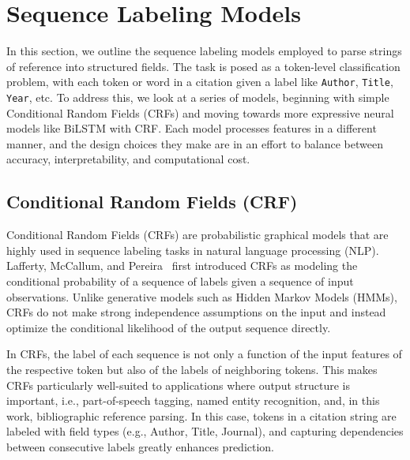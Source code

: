 \section{Sequence Labeling Models}
In this section, we outline the sequence labeling models employed to parse strings of reference into structured fields. The task is posed as a token-level classification problem, with each token or word in a citation given a label like \texttt{Author}, \texttt{Title}, \texttt{Year}, etc. To address this, we look at a series of models, beginning with simple Conditional Random Fields (CRFs) and moving towards more expressive neural models like BiLSTM with CRF. Each model processes features in a different manner, and the design choices they make are in an effort to balance between accuracy, interpretability, and computational cost.
\subsection{Conditional Random Fields (CRF)}
Conditional Random Fields (CRFs) are probabilistic graphical models that are highly used in sequence labeling tasks in natural language processing (NLP). Lafferty, McCallum, and Pereira~\cite{crf2001} first introduced CRFs as modeling the conditional probability of a sequence of labels given a sequence of input observations. Unlike generative models such as Hidden Markov Models (HMMs), CRFs do not make strong independence assumptions on the input and instead optimize the conditional likelihood of the output sequence directly.

In CRFs, the label of each sequence is not only a function of the input features of the respective token but also of the labels of neighboring tokens. This makes CRFs particularly well-suited to applications where output structure is important, i.e., part-of-speech tagging, named entity recognition, and, in this work, bibliographic reference parsing. In this case, tokens in a citation string are labeled with field types (e.g., Author, Title, Journal), and capturing dependencies between consecutive labels greatly enhances prediction.

